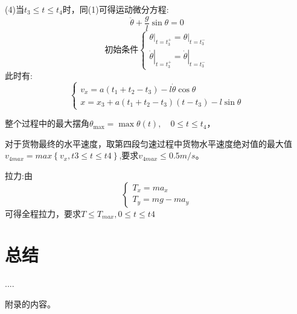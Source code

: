 \documentclass{cumcmthesis}
\begin{document}
(4)当$t_3 \leq t \leq t_4$时，同(1)可得运动微分方程:
$$\ddot{\theta}+\frac{g}{l} \sin \theta=0$$
$$\text{初始条件}\left \{\begin{array}{l}
        \left.\theta\right|_{t=t_{3}^{+}}=\left.\theta\right|_{t=t_{3}^{-}} \\
        \left.\dot{\theta}\right|_{t=t_{3}^{+}}=\left.\dot{\theta}\right|_{t=t_{3}^{-}}
    \end{array}\right.$$
此时有:$$\left\{\begin{array}{l}
    v_{x}=a\left(t_1+t_{2}-t_{3}\right)-l \dot{\theta} \cos \theta \\
    x=x_{3}+a\left(t_{1}+t_{2}-t_{3}\right)\left(t-t_{3}\right)-l \sin \theta
    \end{array}\right.$$

整个过程中的最大摆角$\theta_{\max }=\max \theta(t), \quad 0 \leqslant t \leqslant t_{4}$，

对于货物最终的水平速度，取第四段匀速过程中货物水平速度绝对值的最大值$v_{4max}=max\left \{v_{x},t3 \leq t \leq t4\right \}$,要求$v_{4max} \leq 0.5m/s$。

拉力:由$$\left\{\begin{array}{l}
    T_{x}=m a_{x} \\
    T_{y}=mg-ma_{y}
    \end{array}\right.$$
可得全程拉力，要求$T \leq T_{max},0 \leq t \leq t4$

\section{总结}
\begin{thebibliography}{9}%
     ....
\end{thebibliography}
\begin{appendices}
    附录的内容。
\end{appendices}
\end{document}
